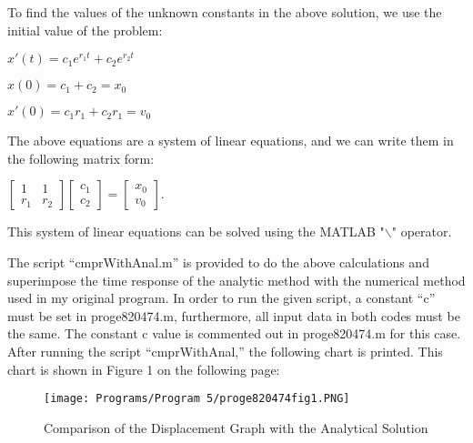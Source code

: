 \documentclass{article}
\begin{document}
{\par \medskip \par
To find the values of the unknown constants in the above solution, we use the initial value of the problem: 
\par \medskip \par
$x'(t)=c_{1}e^{r_{1}t}+c_{2}e^{r_{2}t}$
\par \medskip \par
$x(0)=c_{1}+c_{2}=x_{0}$
\par \medskip \par
$x'(0)=c_{1}r_{1}+c_{2}r_{1}=v_{0}$
\par \medskip \par
The above equations are a system of linear equations, and we can write them in the following matrix form:
\par \medskip \par
$\begin{bmatrix}
1 & 1\\ 
 r_{1}& r_{2} 
\end{bmatrix}
\begin{bmatrix}
c_{1}\\ 
c_{2}
\end{bmatrix}=\begin{bmatrix}
x_{0}\\ 
v_{0}
\end{bmatrix}$.  
\par \medskip \par
This system of linear equations can be solved using the MATLAB "$\backslash$" operator.
\par \medskip \par
The script “cmprWithAnal.m” is provided to do the above calculations and superimpose the time response of the analytic method with the numerical method used in my original program.  In order to run the given script, a constant “c” must be set in proge820474.m, furthermore, all input data in both codes must be the same. The constant c value is commented out in proge820474.m for this case.  After running the script “cmprWithAnal,” the following chart is printed.  This chart is shown in Figure 1 on the following page:
\par \medskip \par
 \begin{figure}[!ht]
\centering  %
\texttt{[image: Programs/Program 5/proge820474fig1.PNG]}
 \caption{Comparison of the Displacement Graph with the Analytical Solution}
 \label{f:Graph 1}

\end{figure}}
\end{document}
